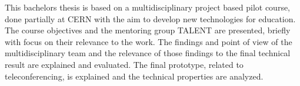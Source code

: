 \documentclass[english,12pt,a4paper,dvips]{article}
\begin{document}
\begin{otherlanguage}{finnish}
%
\end{otherlanguage}

\makecoverpage

\begin{abstractpage}[english]

 This bachelors thesis is based on a multidisciplinary project based pilot course, done partially at CERN with the aim to develop new technologies for education. The course objectives and the mentoring group TALENT are presented, briefly with focus on their relevance to the work. The findings and point of view of the multidisciplinary team and the relevance of those findings to the final technical result are explained and evaluated. The final prototype, related to teleconferencing, is explained and the technical properties are analyzed.
 
\end{abstractpage}

\end{document}
